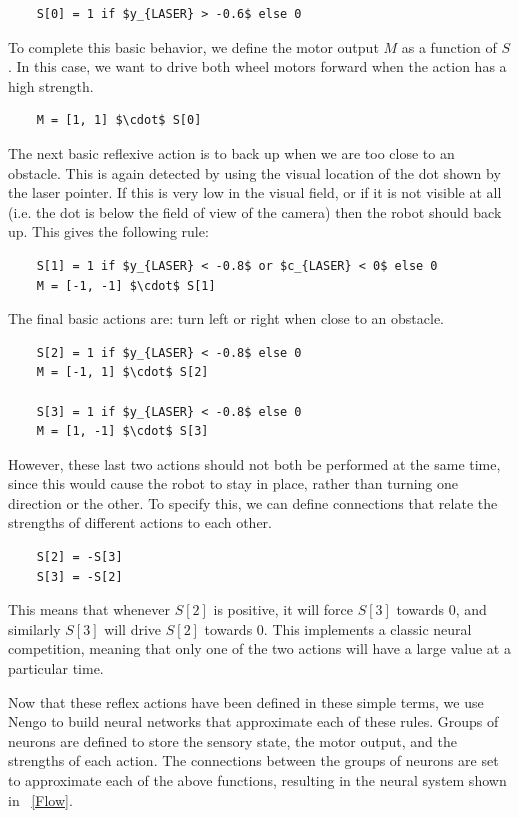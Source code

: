 \documentclass[conference]{IEEEtran}
\begin{document}
\begin{lstlisting}
	S[0] = 1 if $y_{LASER} > -0.6$ else 0
\end{lstlisting}

To complete this basic behavior, we define the motor output $M$ as a 
function of $S$. In this case, we want to drive both wheel motors forward 
when the action has a high strength.

\begin{lstlisting}
	M = [1, 1] $\cdot$ S[0]
\end{lstlisting}

The next basic reflexive action is to back up when we are too close to an 
obstacle. This is again detected by using the visual location of the dot
shown by the laser pointer.  If this is very low in the visual field, or if
it is not visible at all (i.e. the dot is below the field of view of the camera)
then the robot should back up.  This gives the following rule:

\begin{lstlisting}
	S[1] = 1 if $y_{LASER} < -0.8$ or $c_{LASER} < 0$ else 0
	M = [-1, -1] $\cdot$ S[1]
\end{lstlisting}

The final basic actions are: turn left or right when close to an obstacle. 

\begin{lstlisting}
	S[2] = 1 if $y_{LASER} < -0.8$ else 0
	M = [-1, 1] $\cdot$ S[2]

	S[3] = 1 if $y_{LASER} < -0.8$ else 0
	M = [1, -1] $\cdot$ S[3]
\end{lstlisting}

However, these last two actions should not both be performed at the same time,
since this would cause the robot to stay in place, rather than turning one
direction or the other. To specify this, we can define connections that relate 
the strengths of different actions to each other.

\begin{lstlisting}
	S[2] = -S[3]
	S[3] = -S[2]
\end{lstlisting}

This means that whenever $S[2]$ is positive, it will force $S[3]$ towards $0$, 
and similarly $S[3]$ will drive $S[2]$ towards $0$.  This implements a classic
neural competition, meaning that only one of the two actions will have a large
value at a particular time.

Now that these reflex actions have been defined in these simple terms, we use
Nengo to build neural networks that approximate each of these rules.  Groups
of neurons are defined to store the sensory state, the motor output, and the 
strengths of each action. The connections between the groups of neurons are 
set to approximate each of the above functions, resulting in the neural 
system shown in \figurename~\ref{Flow}. 
\end{document}
